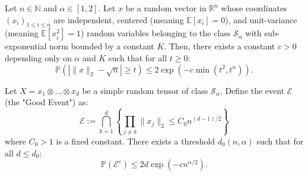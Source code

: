 \documentclass[10pt,a4paper]{amsart}
\begin{document}
\begin{lemma}\label{lem:4.1}
Let $n \in \mathbb{N}$ and $\alpha \in [1, 2]$. Let $x$ be a random vector in $\mathbb{R}^n$ whose coordinates $(x_i)_{1 \leq i \leq n}$ are independent, centered (meaning $\mathbb{E}[x_i]=0$), and unit-variance (meaning $\mathbb{E}[x_i^2]=1$) random variables belonging to the class $\mathcal{S}_\alpha$ with sub-exponential norm bounded by a constant $K$. Then, there exists a constant $c > 0$ depending only on $\alpha$ and $K$ such that for all $t \geq 0$:
\begin{equation} \mathbb{P}\left( \left| \|x\|_2 - \sqrt{n} \right| \geq t \right) \leq 2 \exp\left( -c \min\left( t^2, t^\alpha \right) \right). \end{equation}
\end{lemma}

\begin{proposition}\label{prop:4.2}
Let $X = x_1 \otimes \dots \otimes x_d$ be a simple random tensor of class $\mathcal{S}_{\alpha}$. Define the event $\mathcal{E}$ (the "Good Event") as:
\begin{equation}
\mathcal{E} := \bigcap_{k=1}^d \left\{ \prod_{j \neq k} \|x_j\|_2 \le C_0 n^{(d-1)/2} \right\}
\end{equation}
where $C_0 > 1$ is a fixed constant. There exists a threshold $d_0(n, \alpha)$ such that for all $d \le d_0$:
\begin{equation}
\mathbb{P}(\mathcal{E}^c) \le 2d \exp(-c n^{\alpha/2}).
\end{equation}
\end{proposition}
\end{document}
